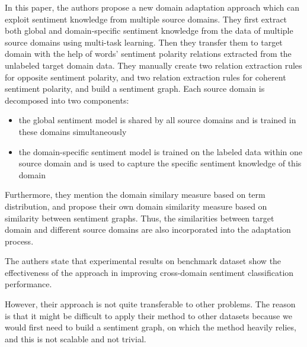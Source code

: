 In this paper, the authors propose a new domain adaptation approach which can exploit sentiment knowledge from multiple
source domains. They first extract both global and domain-specific sentiment knowledge from the data of multiple
source domains using multi-task learning. Then they transfer them to target domain with the help of words’ sentiment
polarity relations extracted from the unlabeled target domain data. They manually create two relation extraction rules for opposite sentiment polarity, and two relation extraction rules for coherent sentiment polarity, and build a sentiment graph. Each source domain is decomposed into two components:
\begin{itemize}
  \item the global sentiment model is shared by all source domains and is trained in these domains simultaneously
  \item the domain-specific sentiment model is trained on the labeled data within one source domain and is used to capture the specific sentiment knowledge of this domain
\end{itemize}

Furthermore, they mention the domain similary measure based on term distribution, and propose their own domain similarity measure based on similarity between sentiment graphs. Thus, the similarities between target domain and different source domains are also incorporated into the adaptation process. 

The authers state that experimental results on benchmark dataset show the effectiveness of the approach in improving cross-domain sentiment classification performance. 

However, their approach is not quite transferable to other problems. The reason is that it might be difficult to apply their method to other datasets because we would first need to build a sentiment graph, on which the method heavily relies, and this is not scalable and not trivial. 





